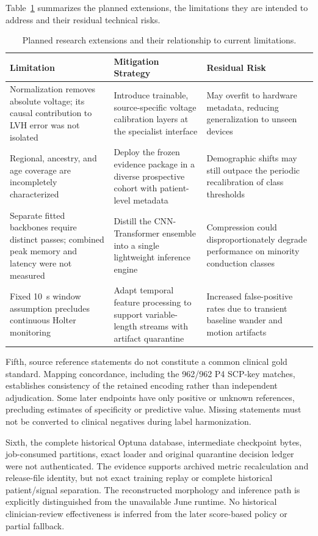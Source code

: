 \documentclass[life,article,submit,moreauthors]{Definitions/mdpi}
\begin{document}
Table~\ref{tab:future_directions} summarizes the planned extensions, the limitations they are intended to address and their residual technical risks.

\begin{table}[htbp]
\caption{Planned research extensions and their relationship to current limitations.\label{tab:future_directions}}
\centering
\small
\begin{tabular}{@{}p{.32\linewidth}p{.35\linewidth}p{.27\linewidth}@{}}
\toprule
\textbf{Limitation} & \textbf{Mitigation Strategy} & \textbf{Residual Risk} \\
\midrule
Normalization removes absolute voltage; its causal contribution to LVH error was not isolated & Introduce trainable, source-specific voltage calibration layers at the specialist interface & May overfit to hardware metadata, reducing generalization to unseen devices \\
Regional, ancestry, and age coverage are incompletely characterized & Deploy the frozen evidence package in a diverse prospective cohort with patient-level metadata & Demographic shifts may still outpace the periodic recalibration of class thresholds \\
Separate fitted backbones require distinct passes; combined peak memory and latency were not measured & Distill the CNN-Transformer ensemble into a single lightweight inference engine & Compression could disproportionately degrade performance on minority conduction classes \\
Fixed 10~s window assumption precludes continuous Holter monitoring & Adapt temporal feature processing to support variable-length streams with artifact quarantine & Increased false-positive rates due to transient baseline wander and motion artifacts \\
\bottomrule
\end{tabular}
\end{table}


Fifth, source reference statements do not constitute a common clinical gold standard. Mapping concordance, including the 962/962 P4 SCP-key matches, establishes consistency of the retained encoding rather than independent adjudication. Some later endpoints have only positive or unknown references, precluding estimates of specificity or predictive value. Missing statements must not be converted to clinical negatives during label harmonization.

Sixth, the complete historical Optuna database, intermediate checkpoint bytes, job-consumed partitions, exact loader and original quarantine decision ledger were not authenticated. The evidence supports archived metric recalculation and release-file identity, but not exact training replay or complete historical patient/signal separation. The reconstructed morphology and inference path is explicitly distinguished from the unavailable June runtime. No historical clinician-review effectiveness is inferred from the later score-based policy or partial fallback.
\end{document}
